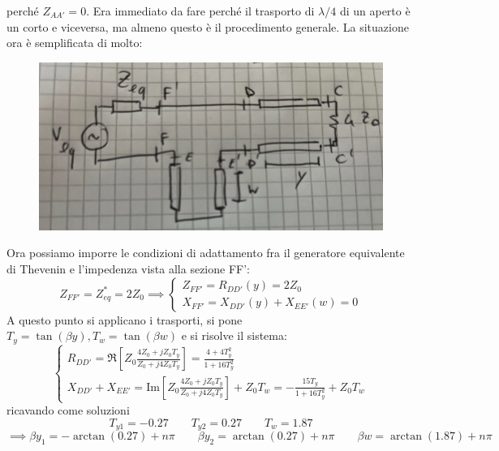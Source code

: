 \documentclass{book}
\begin{document}
        perché $Z_{AA'}=0$. Era immediato da fare perché il trasporto di $\lambda/4$ di un aperto è un corto e viceversa, ma almeno
        questo è il procedimento generale. La situazione ora è semplificata di molto:
        \begin{figure}[h!]
            \center  
            \includegraphics[width=0.7\linewidth]{img/Esercizi/Esercizi2.png}
        \end{figure}
        Ora possiamo imporre le condizioni di adattamento fra il generatore equivalente di Thevenin e l'impedenza vista 
        alla sezione FF':
        \begin{equation}
            Z_{FF'}=Z_{eq} ^{*}=2Z_{0} \implies 
            \begin{cases}
                Z_{FF'} = R_{DD'}(y)= 2Z_{0} \\
                X_{FF'} = X_{DD'}(y)+X_{EE'}(w) = 0    
            \end{cases}
        \end{equation}
        A questo punto si applicano i trasporti, si pone $T_{y}=\tan(\beta y), T_{w}=\tan(\beta w)$ e si risolve il sistema:
        \begin{equation}
            \begin{cases}
            R_{DD'} = \Re [Z_{0} \displaystyle \frac{4Z_{0}+jZ_{0}T_{y}}{Z_{0}+j4Z_{0}T_{y}}] =  \displaystyle \frac{4+4T_{y} ^{2}}{1+16T_{y} ^{2}} \\
            X_{DD'}+X_{EE'} = \textrm{Im}[Z_{0} \displaystyle \frac{4Z_{0}+jZ_{0}T_{y}}{Z_{0}+j4Z_{0}T_{y}}] +Z_{0}T_{w} =  \displaystyle -\frac{15T_{y}}{1+16T_{y} ^{2}}+Z_{0}T_{w}
        \end{cases}
        \end{equation}
        ricavando come soluzioni
        \begin{equation}
            T_{y1} = -0.27 \qquad T_{y2}=0.27 \qquad T_{w}=1.87 
        \end{equation}
        \begin{equation}
         \implies \beta y_{1} = -\arctan(0.27)+n\pi \qquad \beta y_{2}=\arctan(0.27)+n \pi \qquad \beta w = \arctan(1.87)+n \pi
        \end{equation}
\end{document}
